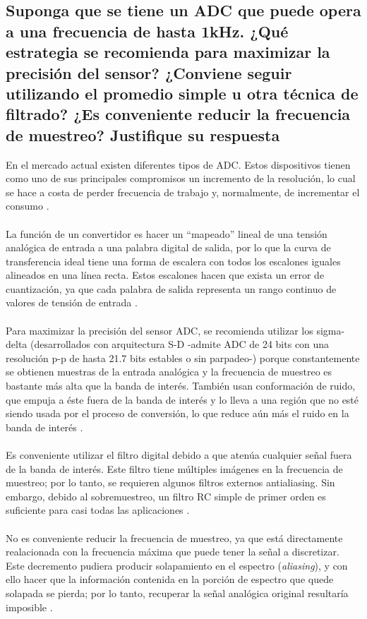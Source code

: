 \documentclass[letterpaper,10.5pt]{article} %
\begin{document}
		\subsection{Suponga que se tiene un ADC que puede opera a una frecuencia de hasta 1kHz. ¿Qué estrategia se recomienda para maximizar la precisión del sensor? ¿Conviene seguir utilizando el promedio simple u otra técnica de filtrado? ¿Es conveniente reducir la frecuencia de muestreo? Justifique su respuesta}
		En el mercado actual existen diferentes tipos de ADC. Estos dispositivos tienen como uno de sus principales compromisos un incremento de la resolución, lo cual se hace a costa de perder frecuencia de trabajo y, normalmente, de incrementar el consumo \cite{lozano2017estudio}.\\ \\
		La función de un convertidor es hacer un ``mapeado'' lineal de una tensión analógica de entrada a una palabra digital de salida, por lo que la curva de transferencia ideal tiene una forma de escalera con todos los escalones iguales alineados en una línea recta. Estos escalones hacen que exista un error de cuantización, ya que cada palabra de salida representa un rango continuo de valores de tensión de entrada \cite{lozano2017estudio}.\\ \\
		Para maximizar la precisión del sensor ADC, se recomienda utilizar los sigma-delta (desarrollados con arquitectura S-D -admite ADC de 24 bits con una resolución p-p de hasta 21.7 bits estables o sin parpadeo-) porque constantemente se obtienen muestras de la entrada analógica y la frecuencia de muestreo es bastante más alta que la banda de interés. También usan conformación de ruido, que empuja a éste fuera de la banda de interés y lo lleva a una región que no esté siendo usada por el proceso de conversión, lo que reduce aún más el ruido en la banda de interés \cite{ADC_sigma}.\\ \\
		Es conveniente utilizar el filtro digital debido a que atenúa cualquier señal fuera de la banda de interés. Este filtro tiene múltiples imágenes en la frecuencia de muestreo; por lo tanto, se requieren algunos filtros externos antialiasing. Sin embargo, debido al sobremuestreo, un filtro RC simple de primer orden es suficiente para casi todas las aplicaciones \cite{ADC_sigma}. \\ \\
		No es conveniente reducir la frecuencia de muestreo, ya que está directamente realacionada con la frecuencia máxima que puede tener la señal a discretizar. Este decremento pudiera producir solapamiento en el espectro (\emph{aliasing}), y con ello hacer que la información contenida en la porción de espectro que quede solapada se pierda; por lo tanto, recuperar la señal analógica original resultaría imposible \cite{bueno2013diseno}.

	\hfill \break %
	
    
\end{document}
